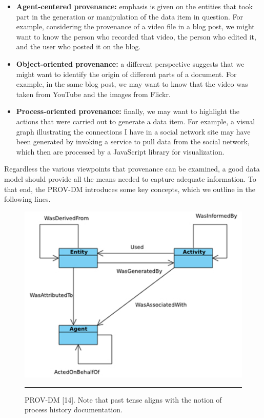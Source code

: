 \begin{itemize}
  \item 
        \textbf{Agent-centered provenance:} emphasis is given on the entities that took part in the generation or manipulation of the data item in question. For example, considering the provenance of a video file in a blog post, we might want to know the person who recorded that video, the person who edited it, and the user who posted it on the blog.
  \item 
        \textbf{Object-oriented provenance:} a different perspective suggests that we might want to identify the origin of different parts of a document. For example, in the same blog post, we may want to know that the video was taken from YouTube and the images from Flickr.
  \item \textbf{Process-oriented provenance:} finally, we may want to highlight the actions that were carried out to generate a data item. For example, a visual graph illustrating the connections I have in a social network site may have been generated by invoking a service to pull data from the social network, which then are processed by a JavaScript library for visualization.
\end{itemize}

Regardless the various viewpoints that provenance can be examined, a good data model should provide all the means needed to capture adequate information. To that end, the PROV-DM introduces some key concepts, which we outline in the following lines.

\begin{figure}[htbp]
	\centering
		\includegraphics{./Figures/figure8.pdf}
		\rule{35em}{0.5pt}
	\caption[PROV-DM]{PROV-DM [14]. Note that past tense aligns with the notion of process history documentation.}
	\label{fig:provDM}
\end{figure}

